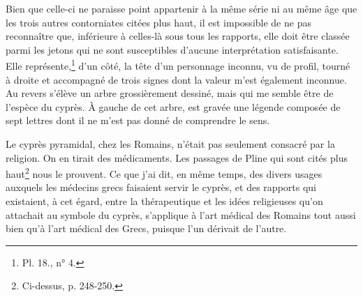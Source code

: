 \documentclass{article}
\begin{document}
Bien que celle-ci ne paraisse point appartenir à la même série ni au même âge que les trois autres contorniates citées plus haut, il est impossible de ne pas reconnaître que, inférieure à celles-là sous tous les rapports, elle doit être classée parmi les jetons qui ne sont susceptibles d'aucune interprétation satisfaisante. Elle représente,\footnote{Pl. 18., n° 4.} d'un côté, la tête d'un personnage inconnu, vu de profil, tourné à droite et accompagné de trois signes dont la valeur m'est également inconnue. Au revers s'élève un arbre grossièrement dessiné, mais qui me semble être de l'espèce du cyprès. À gauche de cet arbre, est gravée une légende composée de sept lettres dont il ne m'est pas donné de comprendre le sens.

Le cyprès pyramidal, chez les Romains, n'était pas seulement consacré par la religion. On en tirait des médicaments. Les passages de Pline qui sont cités plus haut\footnote{Ci-dessus, p. 248-250.} nous le prouvent. Ce que j'ai dit, en même temps, des divers usages auxquels les médecins grecs faisaient servir le cyprès, et des rapports qui existaient, à cet égard, entre la thérapeutique et les idées religieuses qu'on attachait au symbole du cyprès, s'applique à l'art médical des Romains tout aussi bien qu'à l'art médical des Grecs, puisque l'un dérivait de l'autre.
\end{document}
